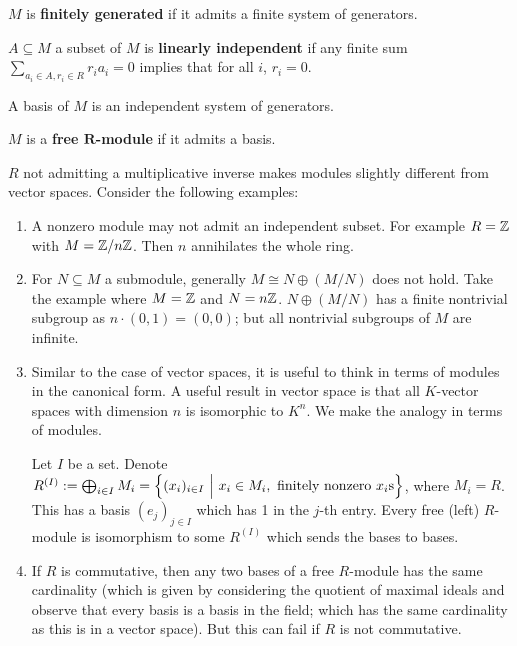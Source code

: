 \begin{definition}
    $M$ is \textbf{finitely generated} if it admits a finite system of generators.
\end{definition}

\begin{definition}
    $A\subseteq M$ a subset of $M$ is \textbf{linearly independent} if any finite sum $\sum\limits_{a_i\in A, r_i\in R} r_i a_i = 0$ implies that for all $i$, $r_i = 0$.
\end{definition}

\begin{definition}[Basis]
    A basis of $M$ is an independent system of generators.
\end{definition}

\begin{definition}
    $M$ is a \textbf{free $\bm{R}$-module} if it admits a basis.
\end{definition}

\begin{remark}\label{rmk:4.1}
    $R$ not admitting a multiplicative inverse makes modules slightly different from vector spaces. Consider the following examples:
    \begin{enumerate}
        \item A nonzero module may not admit an independent subset. For example $R=\mathbb{Z}$ with $M = \mathbb{Z}/n\mathbb{Z}$. Then $n$ annihilates the whole ring.
        \item For $N\subseteq M$ a submodule, generally $M \cong N \oplus (M/N)$ does not hold. Take the example where $M = \mathbb{Z}$ and $N = n\mathbb{Z}$. $N \oplus (M/N)$ has a finite nontrivial subgroup as $n\cdot(0, 1) = (0, 0)$; but all nontrivial subgroups of $M$ are infinite.
        \item Similar to the case of vector spaces, it is useful to think in terms of modules in the canonical form. A useful result in vector space is that all $K$-vector spaces with dimension $n$ is isomorphic to $K^n$. We make the analogy in terms of modules. 
        
        Let $I$ be a set. Denote $R^{(I)} := \bigoplus_{i\in I} M_i = \left\{ (x_i)_{i\in I} \ \Big|\  x_i \in M_i, \text{ finitely nonzero }x_i\text{s} \right\}$, where $M_i = R$. This has a basis $(e_j)_{j\in I}$ which has 1 in the $j$-th entry. Every free (left) $R$-module is isomorphism to some $R^{(I)}$ which sends the bases to bases.
        \item If $R$ is commutative, then any two bases of a free $R$-module has the same cardinality (which is given by considering the quotient of maximal ideals and observe that every basis is a basis in the field; which has the same cardinality as this is in a vector space). But this can fail if $R$ is not commutative.
    \end{enumerate}
\end{remark}

